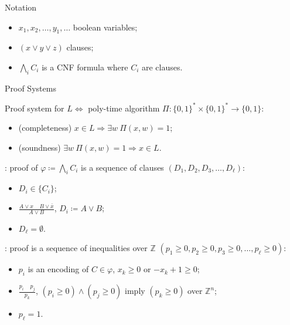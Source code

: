 \begin{frame}{Notation}
    \begin{itemize}
        \item $x_1, x_2, \dots, y_1, \dots$ boolean variables;
        \item $(x \lor y \lor z)$ clauses;
        \item $\bigwedge\limits_{i} C_i$ is a CNF formula where $C_i$ are clauses.
    \end{itemize}
\end{frame}


\begin{frame}{Proof Systems}

    \begin{definition}
        Proof system for $L \Leftrightarrow$ poly-time algorithm
        $\Pi\colon \{0, 1\}^* \times \{0, 1\}^* \rightarrow \{0, 1\}$:
        \begin{itemize}
            \item (completeness) $x \in L \Rightarrow \exists w ~ \Pi(x, w) = 1$;
            \item (soundness) $\exists w ~ \Pi(x, w) = 1 \Rightarrow x \in L$.
        \end{itemize}
    \end{definition}

    : proof of $\varphi \coloneqq \bigwedge\limits_{i} C_i$ is a sequence of clauses
    $(D_1, D_2, D_3, \dots, D_{\ell})$:
    \pause
    
    \begin{minipage}{0.3\linewidth}
        \begin{itemize}
            \item $D_i \in \{C_i\}$;
                \pause
            \item $\frac{A \lor x ~~~~~ B \lor \bar{x}}{A \lor B}$, $D_i \coloneqq A \lor B$;
                \pause
            \item $D_{\ell} = \emptyset$.
        \end{itemize}
    \end{minipage}
    \pause
    \begin{minipage}{0.68\linewidth}
        \centering
        
    \end{minipage}


    \pause
    \vspace{0.3cm}

    : proof is a sequence of inequalities over $\mathbb{Z}$
    $(p_1 \ge 0, p_2 \ge 0, p_3 \ge 0, \dots, p_{\ell} \ge 0)$:
    \begin{itemize}
        \item $p_i$ is an encoding of $C \in \varphi$, $x_k \ge 0$ or $-x_k + 1 \ge 0$;
        \item $\frac{p_i ~~~~~ p_j}{p_k}$,  $(p_i \ge 0) \land (p_j \ge 0)$ imply $(p_k \ge 0)$
            \alert{over $\mathbb{Z}^n$};
        \item $p_{\ell} = 1$.
    \end{itemize}
\end{frame}

